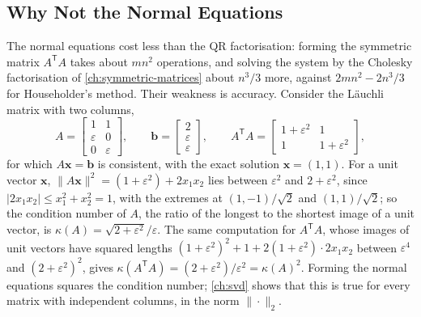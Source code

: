 \subsection{Why Not the Normal Equations}

The normal equations cost less than the QR factorisation: forming the symmetric matrix $A^{\mathsf T}A$ takes about $mn^2$ operations, and solving the system by the Cholesky factorisation of \cref{ch:symmetric-matrices} about $n^3/3$ more, against $2mn^2-2n^3/3$ for Householder's method. Their weakness is accuracy. Consider the L\"auchli matrix with two columns,
\[
A=\begin{bmatrix}1&1\\\varepsilon&0\\0&\varepsilon\end{bmatrix},\qquad\mathbf b=\begin{bmatrix}2\\\varepsilon\\\varepsilon\end{bmatrix},\qquad A^{\mathsf T}A=\begin{bmatrix}1+\varepsilon^2&1\\1&1+\varepsilon^2\end{bmatrix},
\]
for which $A\mathbf x=\mathbf b$ is consistent, with the exact solution $\mathbf x=(1,1)$. For a unit vector $\mathbf x$, $\|A\mathbf x\|^2=(1+\varepsilon^2)+2x_1x_2$ lies between $\varepsilon^2$ and $2+\varepsilon^2$, since $|2x_1x_2|\le x_1^2+x_2^2=1$, with the extremes at $(1,-1)/\sqrt2$ and $(1,1)/\sqrt2$; so the condition number of $A$, the ratio of the longest to the shortest image of a unit vector, is $\kappa(A)=\sqrt{2+\varepsilon^2}/\varepsilon$. The same computation for $A^{\mathsf T}A$, whose images of unit vectors have squared lengths $(1+\varepsilon^2)^2+1+2(1+\varepsilon^2)\cdot2x_1x_2$ between $\varepsilon^4$ and $(2+\varepsilon^2)^2$, gives $\kappa(A^{\mathsf T}A)=(2+\varepsilon^2)/\varepsilon^2=\kappa(A)^2$. Forming the normal equations squares the condition number; \cref{ch:svd} shows that this is true for every matrix with independent columns, in the norm $\|\cdot\|_2$.

